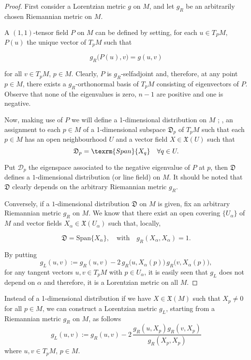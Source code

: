 \begin{proof}
    First consider a Lorentzian metric $g$ on $M$, and let $g_R$ be an arbitrarily chosen Riemannian metric on $M$.

    A $(1,1)$-tensor field $P$ on $M$ can be defined by setting, for each $u \in T_PM$, $P(u)$ the unique vector of $T_pM$ such that

    \[
    g_R\big(P(u),v\big)=g(u,v)
    \]

    for all $v \in T_pM$, $p \in M$. Clearly, $P$ is $g_R$-selfadjoint and, therefore, at any point $p \in M$, there exists a $g_R$-orthonormal basis of $T_pM$ consisting of eigenvectors of $P$. Observe that none of the eigenvalues is zero, $n-1$ are positive and one is negative.
    
    Now, making use of $P$ we will define a 1-dimensional distribution on $M$ \cite{kobnom63}; \ie, an assignment to each $p \in M$ of a 1-dimensional subspace $\mathfrak{D}_p$ of $T_p M$ such that each $p\in M$ has an open neighbourhood $U$ and a vector field $X \in \mathfrak{X}(U)$ such that 
    \[
		\mathfrak{D}_p = \texrm{Span}\{X_q\} \quad \forall q \in U.
    \]
    
    Put $\mathcal{D}_p$ the eigenspace associated to the negative eigenvalue of $P$ at $p$, then $\mathfrak{D}$ defines a $1$-dimensional distribution (or line field) on $M$. It should be noted that $\mathfrak{D}$ clearly depends on the arbitrary Riemannian metric $g_R$.

    Conversely, if a $1$-dimensional distribution $\mathfrak{D}$ on $M$ is given, fix an arbitrary Riemannian metric $g_R$ on $M$. We know that there exist an open covering $\{U_{\alpha}\}$ of $M$ and vector fields $X_\alpha \in \mathfrak{X}(U_\alpha)$ such that, locally,

    \[
    \mathfrak{D}=\mathrm {Span}\{X_{\alpha}\}, \quad \mathrm{with} \quad
    g_R(X_{\alpha},X_{\alpha})=1.
    \]

    By putting
    \[
        g_{L}(u,v):=g_{R}(u,v)-2\,g_{R}\big(u,X_{\alpha}(p)\big)\,g_{R}\big(v,X_{\alpha}(p)\big),
    \]
    for any tangent vectors $u,v \in T_{p}M$ with $p\in U_\alpha$, it is easily seen that $g_{L}$ does not depend on $\alpha$ and therefore, it is a Lorentzian metric on all $M$.
\end{proof}


\begin{remark}
    Instead of a 1-dimensional distribution if we have $X \in \mathfrak{X}(M)$ such that $X_p \neq 0$ for all $p \in M$, we can construct a Lorentzian metric $g_L$, starting from a Riemannian metric $g_R$ on $M$, as follows
    \[
        g_{L}(u,v):=g_{R}(u,v)-2\,\frac{g_R(u,X_p)g_R(v,X_p)}{g_R(X_p,X_p)}
    \]
    where $u,v \in T_{p}M$, $p\in M$.
\end{remark}

